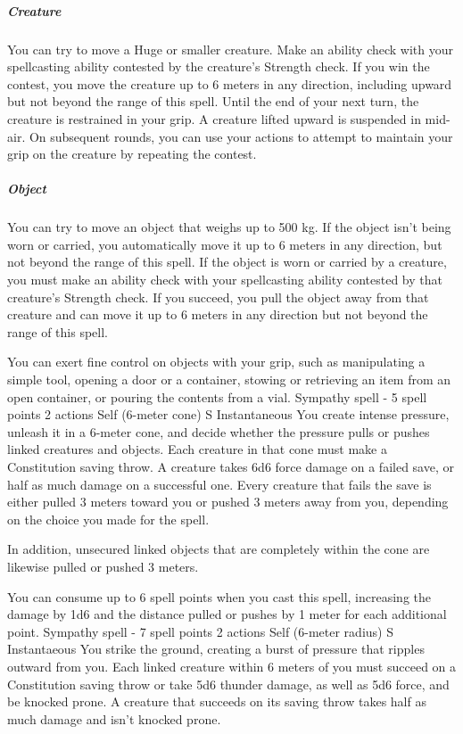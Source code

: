         \subparagraph{Creature}
        You can try to move a Huge or smaller creature.
        Make an ability check with your spellcasting ability contested by the creature's Strength check.
        If you win the contest, you move the creature up to 6 meters in any direction, including upward but not beyond the range of this spell.
        Until the end of your next turn, the creature is restrained in your grip.
        A creature lifted upward is suspended in mid-air.
        On subsequent rounds, you can use your actions to attempt to maintain your grip on the creature by repeating the contest.

        \subparagraph{Object}
        You can try to move an object that weighs up to 500 kg.
        If the object isn't being worn or carried, you automatically move it up to 6 meters in any direction, but not beyond the range of this spell.
        If the object is worn or carried by a creature, you must make an ability check with your spellcasting ability contested by that creature's Strength check.
        If you succeed, you pull the object away from that creature and can move it up to 6 meters in any direction but not beyond the range of this spell.

        You can exert fine control on objects with your grip, such as manipulating a simple tool, opening a door or a container, stowing or retrieving an item from an open container, or pouring the contents from a vial.
        {Sympathy spell - 5 spell points}
        {2 actions}
        {Self (6-meter cone)}
        {S}
        {Instantaneous}
        You create intense pressure, unleash it in a 6-meter cone, and decide whether the pressure pulls or pushes linked creatures and objects.
        Each creature in that cone must make a Constitution saving throw.
        A creature takes 6d6 force damage on a failed save, or half as much damage on a successful one.
        Every creature that fails the save is either pulled 3 meters toward you or pushed 3 meters away from you, depending on the choice you made for the spell.

        In addition, unsecured linked objects that are completely within the cone are likewise pulled or pushed 3 meters.

        You can consume up to 6 spell points when you cast this spell, increasing the damage by 1d6 and the distance pulled or pushes by 1 meter for each additional point.
        {Sympathy spell - 7 spell points}
        {2 actions}
        {Self (6-meter radius)}
        {S}
        {Instantaeous}
        You strike the ground, creating a burst of pressure that ripples outward from you.
        Each linked creature within 6 meters of you must succeed on a Constitution saving throw or take 5d6 thunder damage, as well as 5d6 force, and be knocked prone.
        A creature that succeeds on its saving throw takes half as much damage and isn't knocked prone.

